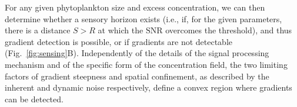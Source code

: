 \documentclass[9pt,twocolumn,twoside]{pnas-new}
\newcommand{\SNR}{\mathrm{SNR}}
\begin{document}
For any given phytoplankton size and excess concentration, we can then determine whether a sensory horizon exists (i.e., if, for the given parameters, there is a distance $S>R$ at which the $\SNR$ overcomes the threshold), and thus gradient detection is possible, or if gradients are not detectable (Fig.~\ref{fig:sensing}B).
Independently of the details of the signal processing mechanism and of the specific form of the concentration field, the two limiting factors of gradient steepness and spatial confinement, as described by the inherent and dynamic noise respectively, define a convex region where gradients can be detected.
\end{document}
